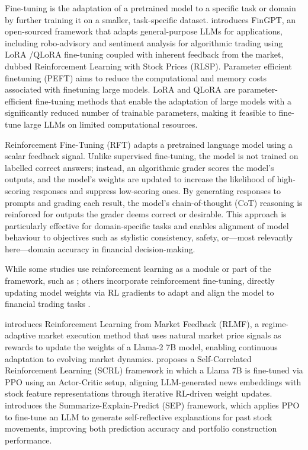 \documentclass[12pt, a4paper]{report}
\begin{document}
Fine-tuning is the adaptation of a pretrained model to a specific task or domain by further training it on a smaller, task-specific dataset.
\cite{liu2023fingpt} introduces FinGPT, an open-sourced framework that adapts general-purpose LLMs for applications,
including robo-advisory and sentiment analysis for algorithmic trading using LoRA \cite{hu2021lora}/QLoRA \cite{dettmers2023qlora} fine-tuning coupled
with inherent feedback from the market, dubbed Reinforcement Learning with Stock Prices (RLSP). 
Parameter efficient finetuning (PEFT) aims to reduce the computational and memory costs
associated with finetuning large models.
LoRA \cite{hu2021lora} and QLoRA \cite{dettmers2023qlora}  are parameter-efficient fine-tuning methods that enable the adaptation of large models with a significantly reduced number of trainable parameters, 
making it feasible to fine-tune large LLMs on limited computational resources.

Reinforcement Fine-Tuning (RFT) adapts a pretrained language model using a scalar feedback
signal. Unlike supervised fine-tuning, the model is not trained on labelled correct answers;
instead, an algorithmic grader scores the model's outputs, and the model's weights are updated
to increase the likelihood of high-scoring responses and suppress low-scoring ones. By
generating responses to prompts and grading each result, the model's chain-of-thought (CoT)
reasoning is reinforced for outputs the grader deems correct or desirable. This approach is
particularly effective for domain-specific tasks \cite{openai2024rft} and enables
alignment of model behaviour to objectives such as stylistic consistency, safety, or---most
relevantly here---domain accuracy in financial decision-making.

While some studies use reinforcement learning as a module or part of the framework,
such as \cite{yu2023finmem, yu2024fincon, gu2024margin}; others incorporate reinforcement fine-tuning,
directly updating model weights via RL gradients to adapt and align the model to financial
trading tasks \cite{saqur2024, ding2023, koa2024explainable}.

\cite{saqur2024} introduces Reinforcement Learning from Market Feedback (RLMF),
a regime-adaptive market execution method that uses natural market price signals as rewards
to update the weights of a Llama-2 7B model, enabling continuous adaptation to evolving
market dynamics.
\cite{ding2023} proposes a Self-Correlated Reinforcement Learning (SCRL) framework in which
a Llama 7B is fine-tuned via PPO using an Actor-Critic setup, aligning LLM-generated
news embeddings with stock feature representations through iterative RL-driven weight updates.
\cite{koa2024explainable} introduces the Summarize-Explain-Predict (SEP) framework, which
applies PPO to fine-tune an LLM to generate self-reflective explanations for past stock
movements, improving both prediction accuracy and portfolio construction performance.
\end{document}
